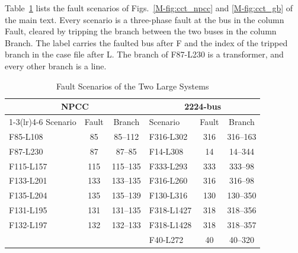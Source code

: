 \documentclass[10pt,journal]{IEEEtran}
\begin{document}
Table~\ref{tab:scenarios} lists the fault scenarios of Figs.~\ref{M-fig:cct_npcc} and \ref{M-fig:cct_gb} of the main text.
Every scenario is a three-phase fault at the bus in the column Fault, cleared by tripping the branch between the two buses in the column Branch.
The label carries the faulted bus after F and the index of the tripped branch in the case file after L.
The branch of F87-L230 is a transformer, and every other branch is a line.

\begin{table}[!h]
\caption{Fault Scenarios of the Two Large Systems}
\label{tab:scenarios}
\centering\footnotesize
\setlength{\tabcolsep}{3.5pt}
\begin{tabular}{lcclcc}
\toprule
\multicolumn{3}{c}{NPCC} & \multicolumn{3}{c}{2224-bus}\\
\cmidrule(lr){1-3}\cmidrule(lr){4-6}
Scenario & Fault & Branch & Scenario & Fault & Branch\\
\midrule
F85-L108 & 85 & 85--112 & F316-L302 & 316 & 316--163\\
F87-L230 & 87 & 87--85 & F14-L308 & 14 & 14--344\\
F115-L157 & 115 & 115--135 & F333-L293 & 333 & 333--98\\
F133-L201 & 133 & 133--135 & F316-L260 & 316 & 316--98\\
F135-L204 & 135 & 135--139 & F130-L316 & 130 & 130--350\\
F131-L195 & 131 & 131--135 & F318-L1427 & 318 & 318--356\\
F132-L197 & 132 & 132--133 & F318-L1428 & 318 & 318--357\\
 & & & F40-L272 & 40 & 40--320\\
\bottomrule
\end{tabular}
\end{table}



\end{document}

